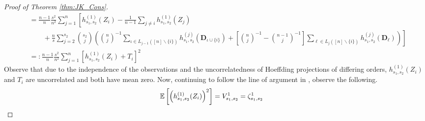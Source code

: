 \begin{proof}[Proof of Theorem \ref{thm:JK_Cons}]
\begin{equation}
\begin{aligned}
			 & = \frac{n-1}{n} \frac{s^2}{n^2}\sum_{j = 1}^{n}\left[
				h^{(1)}_{s_1, s_2}(Z_{i})
			- \frac{1}{n-1} \sum_{j \neq i} h^{(1)}_{s_1, s_2}(Z_{j}) \right.                                   \\
			 & \quad \quad + \left. \frac{n}{s}\sum_{j = 2}^{s_2}\binom{s_2}{j}\left(
				\binom{n}{j}^{-1}\sum_{\iota \in L_{j-1}\left([n] \backslash \{i\}\right)} h^{(j)}_{s_1, s_2}(\mathbf{D}_{\iota \cup \{i\}})
				+ \left[\binom{n}{j}^{-1} - \binom{n - 1}{j}^{-1}\right] \sum_{\ell \in L_{j}\left([n] \backslash \{i\}\right)} h^{(j)}_{s_1, s_2}(\mathbf{D}_{\ell})
				\right)
			\right]                                                                                                      \\
			 & =: \frac{n-1}{n}\frac{s^2}{n^2} \sum_{j = 1}^{n}\left[h^{(1)}_{s_1, s_2}(Z_{i}) + T_{i}\right]^2
		\end{aligned}
	\end{equation}
	Observe that due to the independence of the observations and the uncorrelatedness of Hoeffding projections of differing orders, $h^{(1)}_{s_1, s_2}(Z_{i})$ and $T_{i}$ are uncorrelated and both have mean zero.
	Now, continuing to follow the line of argument in \citet{peng_bias_2021}, observe the following.
	\begin{equation}
		\begin{aligned}
			\mathbb{E}\left[\left(h^{(1)}_{s_1, s_2}(Z_{i})\right)^{2}\right]
			 & = V_{s_1, s_2}^{1}
			= \zeta_{s_1, s_2}^{1}
		\end{aligned}
	\end{equation}


\end{proof}
